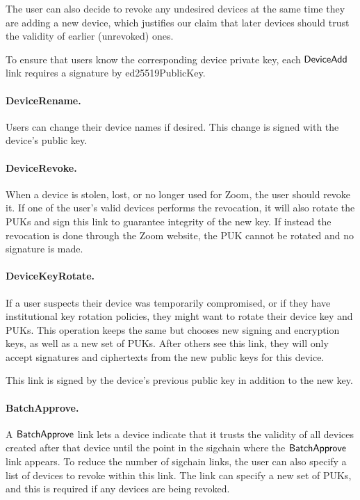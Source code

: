 The user can also decide to revoke any undesired devices at the same time they are adding a new device,
which justifies our claim that later devices should trust the validity of earlier (unrevoked) ones.

To ensure that users know the corresponding device private key, each $\mathsf{DeviceAdd}{}$ link requires a
signature by \textsf{ed25519PublicKey}.

\paragraph{DeviceRename.} Users can change their device names if desired. This change is signed with
the device's public key.

\paragraph{DeviceRevoke.} When a device is stolen, lost, or no longer used for Zoom, the user should
revoke it. If one of the user’s valid devices performs the revocation, it will also rotate the PUKs
and sign this link to guarantee integrity of the new key. If instead the revocation is done through
the Zoom website, the PUK cannot be rotated and no signature is made.

\paragraph{DeviceKeyRotate.} If a user suspects their device was temporarily compromised, or if
they have institutional key rotation policies, they might want to rotate their device key and PUKs.
This operation keeps the same \deviceid but chooses new signing and encryption keys, as well as a
new set of PUKs. After others see this link, they will only accept signatures and ciphertexts from
the new public keys for this device.

This link is signed by the device's previous public key in addition to the new key.

\paragraph{BatchApprove.} A $\mathsf{BatchApprove}{}$ link lets a device indicate that it trusts the
validity of all devices created after that device until the point in the sigchain where the
$\mathsf{BatchApprove}{}$ link appears. To reduce the number of sigchain links, the user can also specify a
list of devices to revoke within this link. The link can specify a new set of PUKs, and this is
required if any devices are being revoked.

